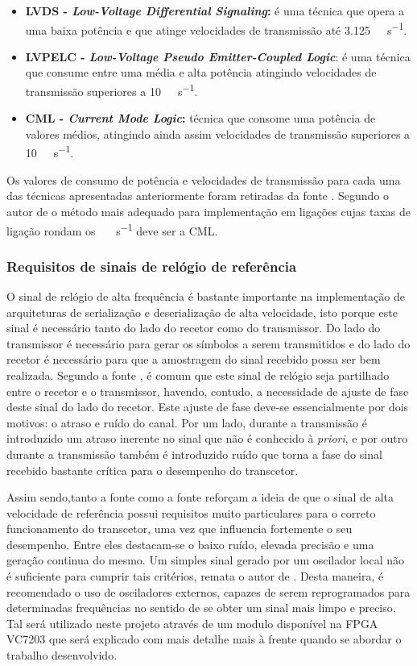 \begin{itemize}
	\item \textbf{LVDS - \textit{Low-Voltage Differential Signaling}:} é uma técnica que opera a uma baixa potência e que atinge velocidades de transmissão até \SI{3.125}{\giga\bit\per\second}.
	\item \textbf{LVPELC - \textit{Low-Voltage Pseudo Emitter-Coupled Logic}}: é uma técnica que consume entre uma média e alta potência atingindo velocidades de transmissão superiores a \SI{10}{\giga\bit\per\second}.
	\item \textbf{CML - \textit{Current Mode Logic}:} técnica que consome uma potência de valores médios, atingindo ainda assim velocidades de transmissão superiores a \SI{10}{\giga\bit\per\second}.
\end{itemize}

Os valores de consumo de potência e velocidades de transmissão para cada uma das técnicas apresentadas anteriormente foram retiradas da fonte \cite{R036}. Segundo o autor de \cite{R032} o método mais adequado para implementação em ligações cujas taxas de ligação rondam os \SI{}{\giga\bit\per\second} deve ser a CML.

\subsubsection*{Requisitos de sinais de relógio de referência}

O sinal de relógio de alta frequência é bastante importante na implementação de arquiteturas de serialização e deserialização de alta velocidade, isto porque este sinal é necessário tanto do lado do recetor como do transmissor. Do lado do transmissor é necessário para gerar os símbolos a serem transmitidos e do lado do recetor é necessário para que a amostragem do sinal recebido possa ser bem realizada. Segundo a fonte \cite{R012}, é comum que este sinal de relógio seja partilhado entre o recetor e o transmissor, havendo, contudo, a necessidade de ajuste de fase deste sinal do lado do recetor. Este ajuste de fase deve-se essencialmente por dois motivos: o atraso e ruído do canal. Por um lado, durante a transmissão é introduzido um atraso inerente no sinal que não é conhecido à \textit{priori}, e por outro durante a transmissão também é introduzido ruído que torna a fase do sinal recebido bastante crítica para o desempenho do transcetor. 

Assim sendo,tanto a fonte \cite{R032} como a fonte \cite{R012} reforçam a ideia de que o sinal de alta velocidade de referência possui requisitos muito particulares para o correto funcionamento do transcetor, uma vez que influencia fortemente o seu desempenho. Entre eles destacam-se o baixo ruído, elevada precisão e uma geração continua do mesmo. Um simples sinal gerado por um oscilador local não é suficiente para cumprir tais critérios, remata o autor de \cite{R012}. Desta maneira, é recomendado o uso de osciladores externos, capazes de serem reprogramados para determinadas frequências no sentido de se obter um sinal mais limpo e preciso. Tal será utilizado neste projeto através de um modulo disponível na FPGA VC7203 que será explicado com mais detalhe mais à frente quando se abordar o trabalho desenvolvido.


